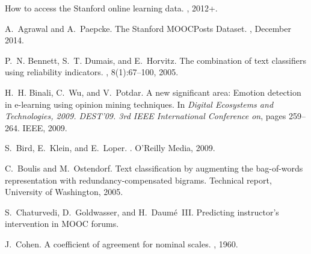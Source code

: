 \documentclass{edm_template}
\begin{document}


%
%
%
\begin{thebibliography}{10}

How to access the Stanford online learning data.
, 2012+.

A.~Agrawal and A.~Paepcke.
\newblock The {Stanford} {MOOCP}osts {Dataset}.
, December
  2014.

P.~N. Bennett, S.~T. Dumais, and E.~Horvitz.
\newblock The combination of text classifiers using reliability indicators.
, 8(1):67--100, 2005.

H.~H. Binali, C.~Wu, and V.~Potdar.
\newblock A new significant area: Emotion detection in e-learning using opinion
  mining techniques.
\newblock In {\em Digital Ecosystems and Technologies, 2009. DEST'09. 3rd IEEE
  International Conference on}, pages 259--264. IEEE, 2009.

S.~Bird, E.~Klein, and E.~Loper.
.
\newblock O'Reilly Media, 2009.

C.~Boulis and M.~Ostendorf.
\newblock Text classification by augmenting the bag-of-words representation
  with redundancy-compensated bigrams.
\newblock Technical report, University of Washington, 2005.

S.~Chaturvedi, D.~Goldwasser, and H.~Daum{\'e}~III.
\newblock Predicting instructor's intervention in {MOOC} forums.

J.~Cohen.
\newblock A coefficient of agreement for nominal scales.
, 1960.


\end{thebibliography}
\end{document}
